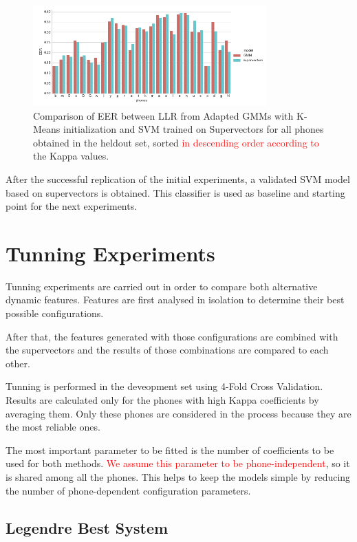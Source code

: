 \begin{figure}[H]
	\centering
	\includegraphics[width=0.8\textwidth]{files/figures/results/gmm-vs-supervectors/gmm-vs-supervectors-heldout.png}
	\caption{Comparison of EER between LLR from Adapted GMMs with K-Means initialization
	and SVM trained on Supervectors for all phones obtained in the heldout set, sorted \textcolor{red}{in descending order according to} the Kappa values.}
	\label{fig:gmmSupervectorsTest}
\end{figure}

After the successful replication of the initial experiments, a validated SVM model based on
supervectors is obtained. This classifier is used as baseline and starting point for
the next experiments.

\section{Tunning Experiments}

Tunning experiments are carried out in order to compare both alternative
dynamic features. Features are first analysed in isolation to
determine their best possible configurations.

After that, the features generated with those configurations are combined with
the supervectors and the results of those combinations are compared to each other.

Tunning is performed in the deveopment set using 4-Fold Cross Validation. Results are
calculated only for the phones with high Kappa coefficients by averaging them.
Only these phones are considered in the process because they are the most reliable ones.

The most important parameter to be fitted is the number of coefficients to be used
for both methods. \textcolor{red}{We assume this parameter to be phone-independent},
so it is shared
among all the phones. This helps to keep
the models simple by reducing the number of phone-dependent configuration parameters.

\subsection{Legendre Best System}

